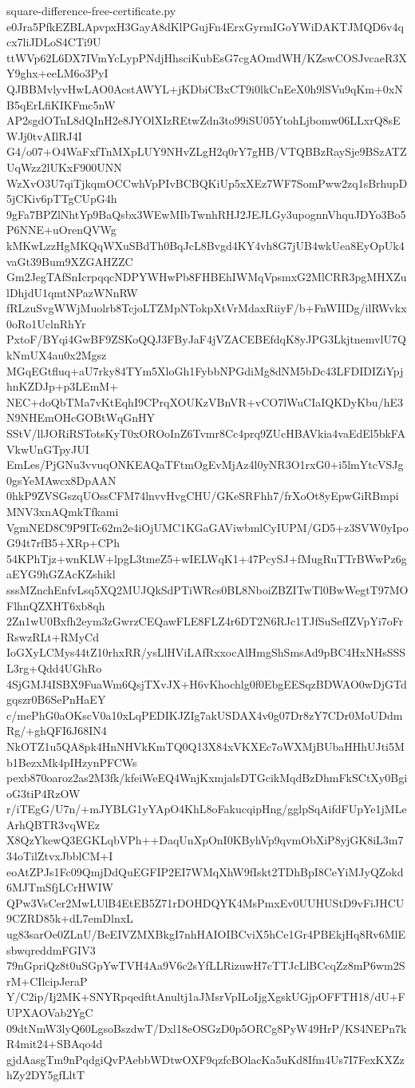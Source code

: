\documentclass[11pt]{article}
\theoremstyle{definition}
\theoremstyle{remark}
\begin{document}
\begin{filecontents*}[overwrite]{square-difference-free-certificate.py}
e0Jra5PfkEZBLApvpxH3GayA8dKlPGujFn4ErxGyrmIGoYWiDAKTJMQD6v4qcx7liJDLoS4CTi9U
ttWVp62L6DX7IVmYcLypPNdjHhsciKubEsG7cgAOmdWH/KZswCOSJvcaeR3XY9ghx+eeLM6o3PyI
QJBBMvlyvHwLAO0AcstAWYL+jKDbiCBxCT9i0lkCnEeX0h9lSVu9qKm+0xNB5qErLfiKIKFmc5nW
AP2sgdOTnL8dQInH2e8JYOlXIzREtwZdn3to99iSU05YtohLjbomw06LLxrQ8sEWJj0tvAIlRJ4I
G4/o07+O4WaFxfTnMXpLUY9NHvZLgH2q0rY7gHB/VTQBBzRaySje9BSzATZUqWzz2lUKxF900UNN
WzXvO3U7qiTjkqmOCCwhVpPIvBCBQKiUp5xXEz7WF7SomPww2zq1sBrhupD5jCKiv6pTTgCUpG4h
9gFa7BPZlNhtYp9BaQsbx3WEwMIbTwnhRHJ2JEJLGy3upognnVhquJDYo3Bo5P6NNE+uOrenQVWg
kMKwLzzHgMKQqWXuSBdTh0BqJcL8Bvgd4KY4vh8G7jUB4wkUea8EyOpUk4vaGt39Bum9XZGAHZZC
Gm2JegTAfSnIcrpqqcNDPYWHwPb8FHBEhIWMqVpsmxG2MlCRR3pgMHXZulDhjdU1qmtNPazWNnRW
fRLzuSvgWWjMuolrb8TcjoLTZMpNTokpXtVrMdaxRiiyF/b+FnWIIDg/ilRWvkx0oRo1UclnRhYr
PxtoF/BYqi4GwBF9ZSKoQQJ3FByJaF4jVZACEBEfdqK8yJPG3LkjtnemvlU7QkNmUX4au0x2Mgsz
MGqEGtfluq+aU7rky84TYm5XloGh1FybbNPGdiMg8dNM5bDc43LFDIDIZiYpjhnKZDJp+p3LEmM+
NEC+doQbTMa7vKtEqhI9CPrqXOUKzVBnVR+vCO7lWuCIaIQKDyKbu/hE3N9NHEmOHcGOBtWqGnHY
SStV/llJORiRSTotsKyT0xOROoInZ6Tvmr8Cc4prq9ZUcHBAVkia4vaEdEl5bkFAVkwUnGTpyJUI
EmLes/PjGNu3vvuqONKEAQaTFtmOgEvMjAz4l0yNR3O1rxG0+i5lmYtcVSJg0gsYeMAwcx8DpAAN
0hkP9ZVSGszqUOssCFM74lnvvHvgCHU/GKeSRFhh7/frXoOt8yEpwGiRBmpiMNV3xnAQmkTfkami
VgmNED8C9P9ITc62m2e4iOjUMC1KGaGAViwbmlCyIUPM/GD5+z3SVW0yIpoG94t7rfB5+XRp+CPh
54KPhTjz+wnKLW+lpgL3tmeZ5+wIELWqK1+47PcySJ+fMugRuTTrBWwPz6gaEYG9hGZAcKZshikl
sssMZnchEnfvLsq5XQ2MUJQkSdPTiWRcs0BL8NboiZBZITwTl0BwWegtT97MOFlhnQZXHT6xb8qh
2Zn1wU0Bxfh2eym3zGwrzCEQawFLE8FLZ4r6DT2N6RJc1TJfSuSefIZVpYi7oFrRswzRLt+RMyCd
IoGXyLCMys44tZ10rhxRR/ysLlHViLAfRxxocAlHmgShSmsAd9pBC4HxNHsSSSL3rg+Qdd4UGhRo
4SjGMJ4ISBX9FuaWm6QsjTXvJX+H6vKhochlg0f0EbgEESqzBDWAO0wDjGTdgqszr0B6SePnHaEY
c/mePhG0aOKscV0a10xLqPEDIKJZIg7akUSDAX4v0g07Dr8zY7CDr0MoUDdmRg/+ghQFI6J68IN4
NkOTZ1u5QA8pk4HnNHVkKmTQ0Q13X84xVKXEc7oWXMjBUbaHHhUJti5Mb1BezxMk4pIHzynPFCWs
pexb870oaroz2as2M3fk/kfeiWeEQ4WnjKxmjalsDTGcikMqdBzDhmFkSCtXy0BgioG3tiP4RzOW
r/iTEgG/U7n/+mJYBLG1yYApO4KhL8oFakucqipHng/gglpSqAifdFUpYe1jMLeArhQBTR3vqWEz
X8QzYkewQ3EGKLqbVPh++DaqUnXpOnI0KByhVp9qvmObXiP8yjGK8iL3m734oTilZtvxJbblCM+I
eoAtZPJs1Fc09QmjDdQuEGFIP2EI7WMqXhW9fIskt2TDhBpI8CeYiMJyQZokd6MJTmSfjLCrHWIW
QPw3VsCer2MwLUlB4EtEB5Z71rDOHDQYK4MsPmxEv0UUHUStD9vFiJHCU9CZRD85k+dL7emDlnxL
ug83sarOe0ZLnU/BeEIVZMXBkgI7nhHAIOIBCviX5hCe1Gr4PBEkjHq8Rv6MlEsbwqreddmFGIV3
79nGpriQz8t0uSGpYwTVH4Aa9V6c2sYfLLRizuwH7cTTJcLlBCcqZz8mP6wm2SrM+CIlcipJeraP
Y/C2ip/Ij2MK+SNYRpqedfttAnultj1aJMsrVpILoIjgXgskUGjpOFFTH18/dU+FUPXAOVab2YgC
09dtNmW3lyQ60LgsoBszdwT/Dxl18eOSGzD0p5ORCg8PyW49HrP/KS4NEPn7kR4mit24+SBAqo4d
gjdAasgTm9nPqdgiQvPAebbWDtwOXF9qzfcBOlacKa5uKd8Ifm4Us7I7FexKXZzhZy2DY5gfLltT

\end{filecontents*}
\end{document}
